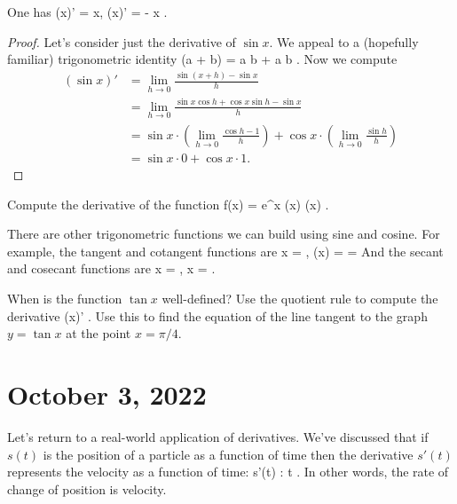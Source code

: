 \documentclass[11pt]{amsart}
\begin{document}
\begin{prop} 
One has
\beqn
(\sin x)' = \cos x, \qquad (\cos x)' = - \sin x .
\eeqn
\end{prop}
\begin{proof}
Let's consider just the derivative of $\sin x$. 
We appeal to a (hopefully familiar) trigonometric identity
\beqn
\sin(a + b) = \sin a \cos b + \cos a \sin b .
\eeqn
Now we compute
\begin{align*}
(\sin x)' & = \lim_{h \to 0} \frac{\sin(x+h) - \sin x}{h} \\
& = \lim_{h \to 0} \frac{\sin x \cos h + \cos x \sin h - \sin x}{h} \\ & = \sin x \cdot \left( \lim_{h \to 0} \frac{\cos h - 1}{h}\right) + \cos x \cdot \left(\lim_{h \to 0} \frac{\sin h}{h} \right) \\
& = \sin x \cdot 0 + \cos x \cdot 1 .
\end{align*} 
\end{proof}

\begin{eg}
Compute the derivative of the function 
\beqn
f(x) = e^x \cos(x) \sin (x) .
\eeqn
\end{eg}
\vspace{5 cm}

There are other trigonometric functions we can build using sine and cosine. 
For example, the tangent and cotangent functions are 
\beqn
\tan x =  , \quad \cot(x) =  =  
\eeqn 
And the secant and cosecant functions are 
\beqn
\sec x =  , \quad \csc x =  .
\eeqn

\begin{eg}
When is the function $\tan x$ well-defined? 
Use the quotient rule to compute the derivative 
\beqn
(\tan x)' .
\eeqn
Use this to find the equation of the line tangent to the graph $y = \tan x$ at the point $x = \pi / 4$. 
\end{eg}
 

\newpage

\section*{October 3, 2022}

Let's return to a real-world application of derivatives.
We've discussed that if $s(t)$ is the position of a particle as a function of time then the derivative $s'(t)$ represents the velocity as a function of time:
\beqn
s'(t) : \quad {} t .
\eeqn
In other words, the rate of change of position is velocity. 
\end{document}

